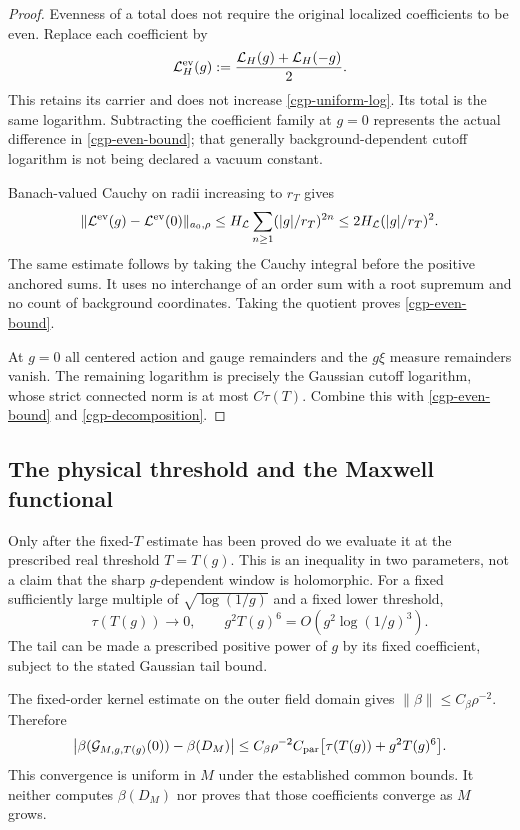 \begin{proof}
Evenness of a total does not require the original localized
coefficients to be even. Replace each coefficient by
\begin{equation}
 \mathcal L_H^{\rm ev}(g)
        :=\frac{\mathcal L_H(g)+\mathcal L_H(-g)}2.
 \label{cgp-even-representative}
\end{equation}
This retains its carrier and does not increase
\eqref{cgp-uniform-log}. Its total is the same logarithm.
Subtracting the coefficient family at $g=0$ represents the
actual difference in \eqref{cgp-even-bound}; that generally
background-dependent cutoff logarithm is not being declared
a vacuum constant.

Banach-valued Cauchy on radii increasing to $r_T$ gives
\begin{equation}
 \|\mathcal L^{\rm ev}(g)-\mathcal L^{\rm ev}(0)\|_{a_0,\rho}
 \le H_{\mathcal L}\sum_{n\ge1}(|g|/r_T)^{2n}
 \le2H_{\mathcal L}(|g|/r_T)^2.
 \label{cgp-Cauchy-proof}
\end{equation}
The same estimate follows by taking the Cauchy integral before
the positive anchored sums. It uses no interchange of an
order sum with a root supremum and no count of background
coordinates. Taking the quotient proves
\eqref{cgp-even-bound}.

At $g=0$ all centered action and gauge remainders and the
$g\xi$ measure remainders vanish. The remaining logarithm is
precisely the Gaussian cutoff logarithm, whose strict
connected norm is at most $C\tau(T)$. Combine this with
\eqref{cgp-even-bound} and \eqref{cgp-decomposition}.
\end{proof}

\subsection{The physical threshold and the Maxwell functional}
\label{cgp-Maxwell-section}

Only after the fixed-$T$ estimate has been proved do we evaluate
it at the prescribed real threshold $T=T(g)$. This is an
inequality in two parameters, not a claim that the sharp
$g$-dependent window is holomorphic. For a fixed sufficiently
large multiple of $\sqrt{\log(1/g)}$ and a fixed lower
threshold,
\[
 \tau(T(g))\longrightarrow0,\qquad
          g^2T(g)^6=O\!\left(g^2\log(1/g)^3\right).
\]
The tail can be made a prescribed positive power of $g$
by its fixed coefficient, subject to the stated Gaussian
tail bound.

The fixed-order kernel estimate on the outer field domain gives
$\|\beta\|\le C_\beta\rho^{-2}$. Therefore
\begin{equation}
 \left|\beta(\mathcal G_{M,g,T(g)}(0))-\beta(D_M)\right|
 \le C_\beta\rho^{-2}C_{\rm par}
                \bigl[\tau(T(g))+g^2T(g)^6\bigr].
 \label{cgp-beta-bound}
\end{equation}
This convergence is uniform in $M$ under the established
common bounds. It neither computes $\beta(D_M)$ nor proves
that those coefficients converge as $M$ grows.

